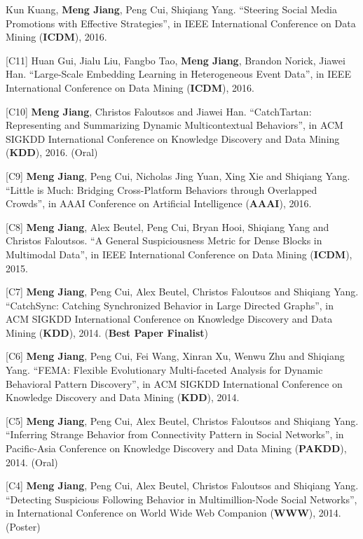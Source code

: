 \documentclass[margin, 9pt]{res}
\begin{document}
\begin{resume}
[C12] Kun Kuang, \textbf{Meng Jiang}, Peng Cui, Shiqiang Yang. ``Steering Social Media Promotions with Effective Strategies'', in IEEE International Conference on Data Mining (\textbf{ICDM}), 2016.

[C11] Huan Gui, Jialu Liu, Fangbo Tao, \textbf{Meng Jiang}, Brandon Norick, Jiawei Han. ``Large-Scale Embedding Learning in Heterogeneous Event Data'', in IEEE International Conference on Data Mining (\textbf{ICDM}), 2016.

[C10] \textbf{Meng Jiang}, Christos Faloutsos and Jiawei Han. ``CatchTartan: Representing and Summarizing Dynamic Multicontextual Behaviors'', in ACM SIGKDD International Conference on Knowledge Discovery and Data Mining (\textbf{KDD}), 2016. (Oral)

[C9] \textbf{Meng Jiang}, Peng Cui, Nicholas Jing Yuan, Xing Xie and Shiqiang Yang. ``Little is Much: Bridging Cross-Platform Behaviors through Overlapped Crowds'', in AAAI Conference on Artificial Intelligence (\textbf{AAAI}), 2016.

[C8] \textbf{Meng Jiang}, Alex Beutel, Peng Cui, Bryan Hooi, Shiqiang Yang and Christos Faloutsos. ``A General Suspiciousness Metric for Dense Blocks in Multimodal Data'', in IEEE International Conference on Data Mining (\textbf{ICDM}), 2015.

[C7] \textbf{Meng Jiang}, Peng Cui, Alex Beutel, Christos Faloutsos and Shiqiang Yang. ``CatchSync: Catching Synchronized Behavior in Large Directed Graphs'', in ACM SIGKDD International Conference on Knowledge Discovery and Data Mining (\textbf{KDD}), 2014. (\textbf{Best Paper Finalist})

[C6] \textbf{Meng Jiang}, Peng Cui, Fei Wang, Xinran Xu, Wenwu Zhu and Shiqiang Yang. ``FEMA: Flexible Evolutionary Multi-faceted Analysis for Dynamic Behavioral Pattern Discovery'', in ACM SIGKDD International Conference on Knowledge Discovery and Data Mining (\textbf{KDD}), 2014.

[C5] \textbf{Meng Jiang}, Peng Cui, Alex Beutel, Christos Faloutsos and Shiqiang Yang. ``Inferring Strange Behavior from Connectivity Pattern in Social Networks'', in Pacific-Asia Conference on Knowledge Discovery and Data Mining (\textbf{PAKDD}), 2014. (Oral)

[C4] \textbf{Meng Jiang}, Peng Cui, Alex Beutel, Christos Faloutsos and Shiqiang Yang. ``Detecting Suspicious Following Behavior in Multimillion-Node Social Networks'', in International Conference on World Wide Web Companion (\textbf{WWW}), 2014. (Poster)


\end{resume}
\end{document}
